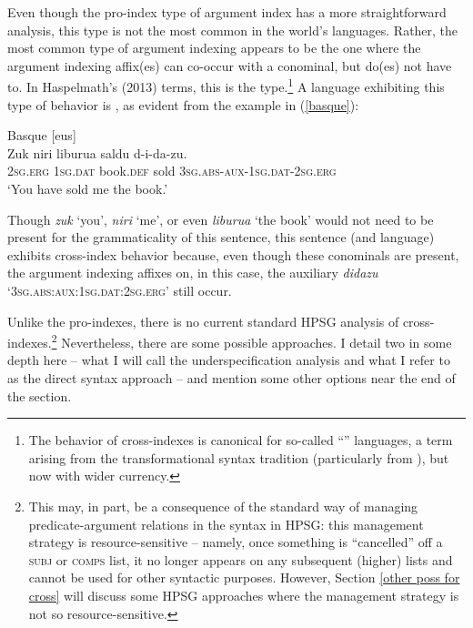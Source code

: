 \documentclass[output=paper
	        ,collection
	        ,collectionchapter
 	        ,biblatex
                ,babelshorthands
                ,newtxmath
                ,draftmode
                ,colorlinks, citecolor=brown
]{langscibook}
\begin{document}
Even though the pro-index type of argument index has a more straightforward analysis, this type is not the most common in the world's languages. Rather, the most common type of argument indexing appears to be the one where the argument indexing affix(es) can co-occur with a conominal, but do(es) not have to.  In Haspelmath's (2013) terms, this is the  type.\footnote{The behavior of cross-indexes is canonical for so-called ``'' languages, a term arising from the transformational syntax tradition (particularly from \citealt{Chomsky81a}), but now with wider currency.} A language exhibiting this type of behavior is , as evident from the example in (\ref{basque}):    
%
\begin{samepage}
\begin{exe}
\ex\label{basque} Basque [eus] \citep[98]{laka96} \\
\gll Zuk niri liburua saldu d-i-da-zu. \\
\textsc{2sg.erg} \textsc{1sg.dat} book.\textsc{def} sold \textsc{3sg.abs}-\textsc{aux}-\textsc{1sg.dat}-\textsc{2sg.erg} \\
\glt `You have sold me the book.' 
\end{exe} 
\end{samepage}
%
Though \textit{zuk} `you', \textit{niri} `me', or even \textit{liburua}  `the book' would not need to be present for the grammaticality of this sentence, this sentence (and language) exhibits cross-index behavior because, even though these conominals are present, the argument indexing affixes on, in this case, the auxiliary \textit{didazu} `\textsc{3sg.abs}:\-\textsc{aux}:\-\textsc{1sg.dat}:\-\textsc{2sg.erg}' still occur. 

Unlike the pro-indexes, there is no current standard HPSG analysis of cross-indexes.\footnote{This may, in part, be a consequence of the standard way of managing predicate-argument relations in the syntax in HPSG: this management strategy is resource-sensitive -- namely, once something is ``cancelled'' off a \textsc{subj} or \textsc{comps} list, it no longer appears on any subsequent (higher) lists and cannot be used for other syntactic purposes. However, Section \ref{other poss for cross} will discuss some HPSG approaches where the management strategy is not so resource-sensitive.} Nevertheless, there are some possible approaches. I detail two in some depth here -- what I will call the underspecification analysis and what I refer to as the direct syntax approach -- and mention some other options near the end of the section.
\end{document}
